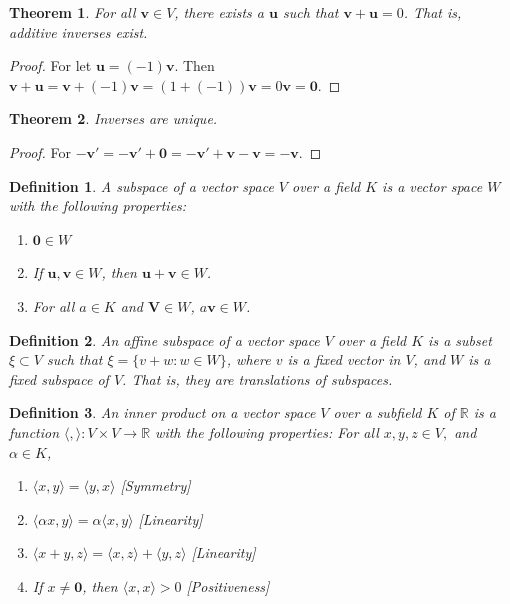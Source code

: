 \documentclass[oneside]{book}
\theoremstyle{mystyle}
\newtheorem{theorem}{Theorem}[section]
\newtheorem{definition}{Definition}[section]
\begin{document}
\begin{theorem}
For all $\mathbf{v}\in V$, there exists a $\mathbf{u}$ such that $\mathbf{v}+\mathbf{u}=0$. That is, additive inverses exist.
\end{theorem}
\begin{proof}
For let $\mathbf{u} = (-1)\mathbf{v}$. Then $\mathbf{v}+\mathbf{u} = \mathbf{v}+(-1)\mathbf{v} = (1+(-1))\mathbf{v} = 0\mathbf{v} = \mathbf{0}$.
\end{proof}

\begin{theorem}
Inverses are unique.
\end{theorem}
\begin{proof}
For $-\mathbf{v}' = -\mathbf{v}'+\mathbf{0} = -\mathbf{v}'+\mathbf{v}-\mathbf{v} = - \mathbf{v}$.
\end{proof}

\begin{definition}
A subspace of a vector space $V$ over a field $K$ is a vector space $W$ with the following properties:
\begin{enumerate}
\item $\mathbf{0} \in W$
\item If $\mathbf{u,v}\in W$, then $\mathbf{u}+\mathbf{v} \in W$.
\item For all $a\in K$ and $\mathbf{V} \in W$, $a\mathbf{v} \in W$.
\end{enumerate}
\end{definition}

\begin{definition}
An affine subspace of a vector space $V$ over a field $K$ is a subset $\xi\subset V$ such that $\xi = \{v+w:w\in W\}$, where $v$ is a fixed vector in $V$, and $W$ is a fixed subspace of $V$. That is, they are translations of subspaces.
\end{definition}

\begin{definition}
An inner product on a vector space $V$ over a subfield $K$ of $\mathbb{R}$ is a function $\langle , \rangle:V\times V\rightarrow \mathbb{R}$ with the following properties: For all $x,y,z \in V,$ and $\alpha \in K$,
\begin{enumerate}
\item $\langle x,y \rangle = \langle y,x \rangle$ \hfill [Symmetry]
\item $\langle \alpha x, y \rangle = \alpha \langle x,y \rangle$ \hfill [Linearity]
\item $\langle x+y,z \rangle = \langle x,z\rangle + \langle y,z \rangle$ \hfill [Linearity]
\item  If $x\ne \mathbf{0}$, then $\langle x,x\rangle >0$ \hfill [Positiveness]
\end{enumerate}
\end{definition}
\end{document}
